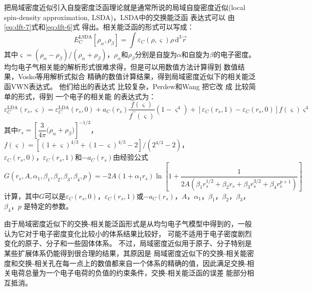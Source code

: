 把局域密度近似引入自旋密度泛函理论就是通常所说的局域{自旋}密度近似(local spin-density approximation, LSDA)，LSDA中的交换能{泛函}%
{表达}式可以%
{由}\eqref{eq:dft-7}式和\eqref{eq:dft-6}式%
{得}出{。}相关能泛函的形式可以写成：
$$E_C^{\mathrm{LSDA}}[\rho_{\alpha},\rho_{\beta}]=\int{\varepsilon_C(\rho,\varsigma)\rho\,\textrm{d}^3\vec{r}}$$
其中$\varsigma=(\rho_{\alpha}-\rho_{\beta})
/(\rho_{\alpha}+\rho_{\beta})
$，$\rho_{\alpha}$和$\rho_{\beta}$分别是自旋为$\alpha$和自旋为$\beta$的电子密度。均匀电子气相关能的解析形式很难求得，但是可以用数值方法计算得到%
数值结果，Vosko等\cite{CJP58-1200_1980}用解析式拟合%
精确的数值计算结果，得到局域密度近似下的相关能泛函VWN表达式{。}%
他们给出的表达式%
{比较}复杂，Perdew和Wang\cite{PRB45-13244_1992}%
把它改%
成%
{比较}简单的形式，得到%
{一个电子的}相关能%
{的}表达式为：
\begin{equation}
  \label{eq:dft-8}
  \varepsilon_C^{\mathrm{LDA}}(r_s,\varsigma)=\varepsilon_C^{\mathrm{LDA}}(r_s,0)+a_C(r_s)\dfrac{f(\varsigma)}{f^{\prime\prime}(\varsigma)}(1-\varsigma^4)+[\varepsilon_C(r_s,1)-\varepsilon_C(r_s,0)]f(\varsigma)\varsigma^4
\end{equation}
其中$r_s=\left[\dfrac 3{4\pi}\bigl(\rho_{\alpha}+\rho_{\beta}\bigr)\right]^{-1/3}$，$f(\varsigma)=[(1+\varsigma)^{4/3}+(1-\varsigma)^{4/3}-2]/(2^{4/3}-2)$，\\$\varepsilon_C(r_s,0)$，$\varepsilon_C(r_s,1)$和$-a_C(r_s)$由经验公式
$$G(r_s,A,\alpha_1,\beta_1,\beta_2,\beta_3,\beta_4,p)=-2A(1+\alpha_1r_s)\ln\left[1+\dfrac1{2A(\beta_1r_s^{1/2}+\beta_2r_s+\beta_3r_s^{3/2}+\beta_4r_s^{p+1})}\right]$$
计算{，}其中{$G$可以是$\varepsilon_C(r_s,0)$，$\varepsilon_C(r_s,1)$或$-a_C(r_s)$}，$A$，$\alpha_1$，$\beta_1$，$\beta_2$，$\beta_3$，$\beta_4$，$p$%
是{特定的}参数。

由于局域密度近似下的交换-相关能泛函形式是从均匀电子气模型中得到的，一般认为它对于电子密度变化比较小的体系结果比较好，%
{可能}不适用于电子密度剧烈变化的原子、分子和一些固体体系。%
{不过}，局域密度近似用于原子、分子特别是某些扩展体系仍能得到很合理的结果，其原因是%
局域密度近似下的交换-相关能密度和交换-相关孔在每一点上的数值都来自一个体系的精确的值，因此满足交换-相关电荷总量为一个电子电荷的负值的约束条件，交换-相关能泛函的误差%
{能部分}相互抵消。

